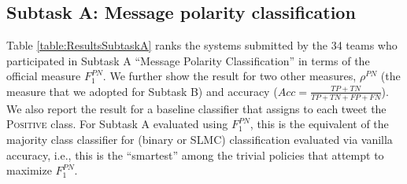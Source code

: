 \documentclass[11pt,letterpaper]{article}
\begin{document}
\subsection{Subtask A: Message polarity classification}
\label{sec:4Adiscussion}

\noindent Table \ref{table:ResultsSubtaskA} ranks the systems submitted by the 34 teams who
participated in Subtask A ``Message Polarity Classification'' in terms
of the official measure $F_1^{PN}$. 
We further show the result for two other measures,
$\rho^{PN}$ (the measure that we adopted for Subtask B) and accuracy
($Acc=\frac{TP+TN}{TP+TN+FP+FN}$). We also report the result for a
baseline classifier that assigns to each tweet the \textsc{Positive}
class. For Subtask A evaluated using $F_1^{PN}$, this is the equivalent
of the majority class classifier for (binary or SLMC) classification
evaluated via vanilla accuracy, i.e., this is the ``smartest'' among
the trivial policies that attempt to maximize $F_1^{PN}$.
\end{document}
